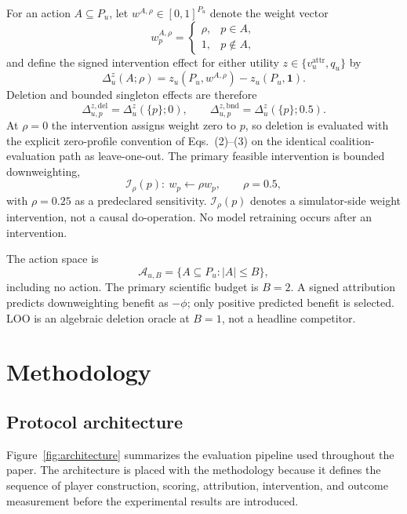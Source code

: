 \documentclass[pdflatex,sn-mathphys-num]{sn-jnl}
\theoremstyle{thmstyleone}
\theoremstyle{thmstyletwo}
\theoremstyle{thmstylethree}
\begin{document}
For an action $A\subseteq P_u$, let $w^{A,\rho}\in[0,1]^{P_u}$ denote the weight vector
\begin{equation}
w_p^{A,\rho}=\begin{cases}\rho,&p\in A,\\1,&p\notin A,\end{cases}
\end{equation}
and define the signed intervention effect for either utility $z\in\{v_u^{\mathrm{attr}},q_u\}$ by
\begin{equation}
\Delta_u^z(A;\rho)=z_u(P_u,w^{A,\rho})-z_u(P_u,\mathbf{1}).
\end{equation}
Deletion and bounded singleton effects are therefore
\begin{equation}
\Delta_{u,p}^{z,\mathrm{del}}=\Delta_u^z(\{p\};0),
\qquad
\Delta_{u,p}^{z,\mathrm{bnd}}=\Delta_u^z(\{p\};0.5).
\end{equation}
At $\rho=0$ the intervention assigns weight zero to $p$, so deletion is evaluated with the explicit zero-profile convention of Eqs.~(2)--(3) on the identical coalition-evaluation path as leave-one-out. The primary feasible intervention is bounded downweighting,
\begin{equation}
\mathcal{I}_\rho(p):\ w_p\leftarrow\rho w_p,\qquad \rho=0.5,
\end{equation}
with $\rho=0.25$ as a predeclared sensitivity. $\mathcal{I}_\rho(p)$ denotes a simulator-side weight intervention, not a causal do-operation. No model retraining occurs after an intervention.

The action space is
\begin{equation}
\mathcal A_{u,B}=\{A\subseteq P_u:|A|\le B\},
\end{equation}
including no action. The primary scientific budget is $B=2$. A signed attribution predicts downweighting benefit as $-\phi$; only positive predicted benefit is selected. LOO is an algebraic deletion oracle at $B=1$, not a headline competitor.

\section{Methodology}
\subsection{Protocol architecture}
Figure~\ref{fig:architecture} summarizes the evaluation pipeline used throughout the paper. The architecture is placed with the methodology because it defines the sequence of player construction, scoring, attribution, intervention, and outcome measurement before the experimental results are introduced.
\end{document}
